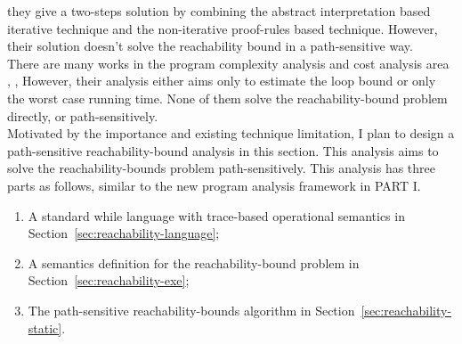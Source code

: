     they give a two-steps solution by combining the abstract interpretation based iterative technique
    and the non-iterative proof-rules based technique.
    However, their solution doesn't solve the reachability
    bound in a path-sensitive way.
    \\
    There are many works in the program complexity analysis and cost analysis area
    \cite{GustafssonEL05, HumenbergerJK18}, 
    \cite{BrockschmidtEFFG16,AlbertAGP08,AliasDFG10,Flores-MontoyaH14}, 
    However, their analysis either aims only to estimate the loop bound
    or only the worst case running time.
    None of them solve the reachability-bound problem directly, or path-sensitively.
    \\
    Motivated by the importance and existing technique limitation,
    I plan to design a path-sensitive reachability-bound analysis in this section.
    This analysis aims to solve the 
    reachability-bounds problem path-sensitively.
    This analysis has three parts as follows, similar to the new program analysis framework in PART I.
    \begin{enumerate}
      \item A standard while language with trace-based operational semantics in Section~\ref{sec:reachability-language};
      \item A semantics definition for the reachability-bound problem in Section~\ref{sec:reachability-exe};
      \item The path-sensitive reachability-bounds algorithm in Section~\ref{sec:reachability-static}.
   \end{enumerate}

